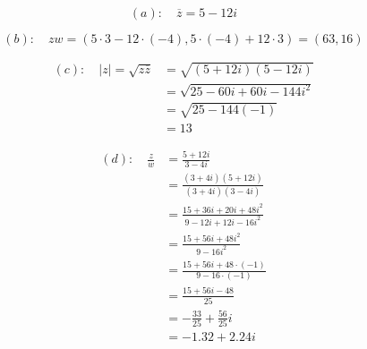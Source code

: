 \documentclass[a4paper,12pt]{article}
\begin{document}
\begin{enumerate}
\begin{equation*}
    (a):\quad \overline{z}=5-12i
\end{equation*}



\begin{equation*}
    (b):\quad zw=(5\cdot3-12\cdot (-4), 5\cdot (-4)+12\cdot 3)=(63,16)
\end{equation*}

\begin{align*}
    (c):\quad |z|=\sqrt{z\overline{z}}&=\sqrt{(5+12i)(5-12i)}\\
    &=\sqrt{25-60i+60i-144i^2}\\
    &=\sqrt{25-144(-1)}\\
    &=13
\end{align*}

\begin{align*}
    (d):\quad \frac{z}{w}&=\frac{5+12i}{3-4i}\\
    &=\frac{(3+4i)(5+12i)}{(3+4i)(3-4i)}\\
    &=\frac{15+36i+20i+48i^2}{9-12i+12i-16i^2}\\
    &=\frac{15+56i+48i^2}{9-16i^2}\\
    &=\frac{15+56i+48\cdot (-1)}{9-16\cdot (-1)}\\
    &=\frac{15+56i-48}{25}\\
    &=-\frac{33}{25}+\frac{56}{25}i\\
    &=-1.32+2.24i
\end{align*}

 \end{enumerate}
\end{document}
